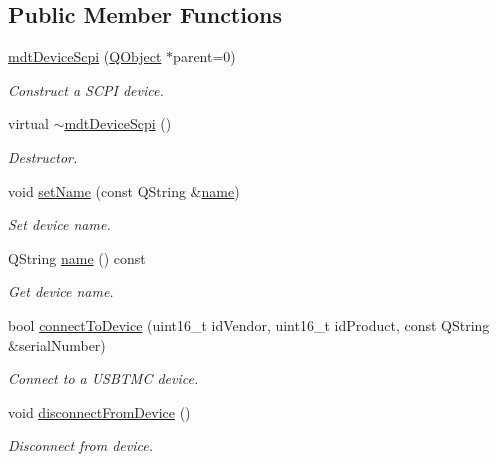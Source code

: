 \subsection*{Public Member Functions}
\begin{DoxyCompactItemize}
\item 
\hyperlink{classmdt_device_scpi_a44c03151a6796e5c1efd64ef55f2d14d}{mdt\-Device\-Scpi} (\hyperlink{class_q_object}{Q\-Object} $\ast$parent=0)
\begin{DoxyCompactList}\small\item\em Construct a S\-C\-P\-I device. \end{DoxyCompactList}\item 
virtual \hyperlink{classmdt_device_scpi_ae173b9ad3d528005e124624ca9bb7b64}{$\sim$mdt\-Device\-Scpi} ()
\begin{DoxyCompactList}\small\item\em Destructor. \end{DoxyCompactList}\item 
void \hyperlink{classmdt_device_scpi_aae5462f105c7c35551f8e9b789a65ea5}{set\-Name} (const Q\-String \&\hyperlink{classmdt_device_scpi_a64e12cc38a7b0b2505af9ff8d4cdf85d}{name})
\begin{DoxyCompactList}\small\item\em Set device name. \end{DoxyCompactList}\item 
Q\-String \hyperlink{classmdt_device_scpi_a64e12cc38a7b0b2505af9ff8d4cdf85d}{name} () const 
\begin{DoxyCompactList}\small\item\em Get device name. \end{DoxyCompactList}\item 
bool \hyperlink{classmdt_device_scpi_a94c8fde98a0fa2f933b3c069aa1e4fa0}{connect\-To\-Device} (uint16\-\_\-t id\-Vendor, uint16\-\_\-t id\-Product, const Q\-String \&serial\-Number)
\begin{DoxyCompactList}\small\item\em Connect to a U\-S\-B\-T\-M\-C device. \end{DoxyCompactList}\item 
void \hyperlink{classmdt_device_scpi_a6b89ee9ab64d04011ec058c8726a2e61}{disconnect\-From\-Device} ()
\begin{DoxyCompactList}\small\item\em Disconnect from device. \end{DoxyCompactList}\item 

\end{DoxyCompactItemize}
